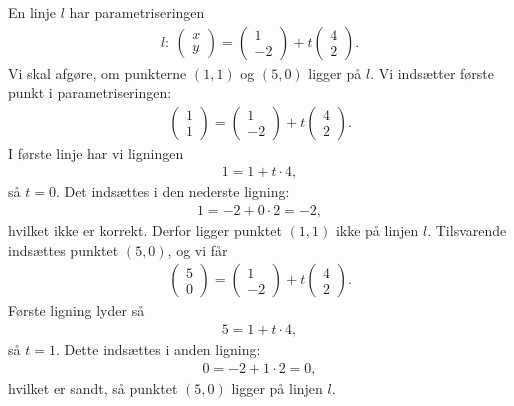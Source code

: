 \begin{exa}
	En linje $l$ har parametriseringen 
	\begin{align*}
		l: \  \begin{pmatrix} x \\ y \end{pmatrix} = 
		\begin{pmatrix} 1 \\ -2 \end{pmatrix} + t
		\begin{pmatrix}
			4\\2
		\end{pmatrix}.
	\end{align*}
	Vi skal afgøre, om punkterne $(1,1)$ og $(5,0)$ ligger på $l$. Vi indsætter første punkt i 
	parametriseringen:
	\begin{align*}
		\begin{pmatrix}
			1 \\ 1
		\end{pmatrix} =
		\begin{pmatrix}
			1 \\ -2
		\end{pmatrix} + t
		\begin{pmatrix}
			4 \\ 2
		\end{pmatrix}.
	\end{align*}
	I første linje har vi ligningen
	\begin{align*}
		1 = 1 + t\cdot 4,
	\end{align*}
	så $t = 0$. Det indsættes i den nederste ligning:
	\begin{align*}
		1 = -2 + 0\cdot  2 = -2,
	\end{align*}
	hvilket ikke er korrekt. Derfor ligger punktet $(1,1)$ ikke på linjen $l$. 
	Tilsvarende indsættes punktet $(5,0)$, og vi får
	\begin{align*}
		\begin{pmatrix}
			5 \\ 0
		\end{pmatrix} = 
		\begin{pmatrix}
			1 \\ -2
		\end{pmatrix} + t
		\begin{pmatrix}
			4 \\ 2
		\end{pmatrix}.
	\end{align*}
	Første ligning lyder så
	\begin{align*}
		5 = 1 + t\cdot 4,
	\end{align*}
	så $t = 1$. Dette indsættes i anden ligning:
	\begin{align*}
		0 = -2 + 1\cdot 2 = 0,
	\end{align*}
	hvilket er sandt, så punktet $(5,0)$ ligger på linjen $l$. 
\end{exa}

